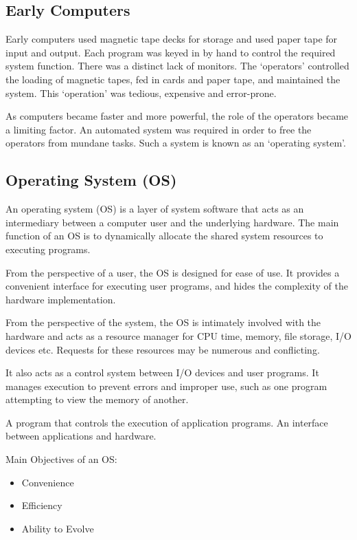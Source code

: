 \subsection{Early Computers}

Early computers used magnetic tape decks for storage and used paper tape for input and output.
Each program was keyed in by hand to control the required system function.
There was a distinct lack of monitors.
The `operators' controlled the loading of magnetic tapes, fed in cards and paper tape, and maintained the system.
This `operation' was tedious, expensive and error-prone.

As computers became faster and more powerful, the role of the operators became a limiting factor.
An automated system was required in order to free the operators from mundane tasks.
Such a system is known as an `operating system'.

\subsection{Operating System (OS)}

An operating system (OS) is a layer of system software that acts as an intermediary between a computer user and the underlying hardware.
The main function of an OS is to dynamically allocate the shared system resources to executing programs.

From the perspective of a user, the OS is designed for ease of use.
It provides a convenient interface for executing user programs, and hides the complexity of the hardware implementation.

From the perspective of the system, the OS is intimately involved with the hardware and acts as a resource manager for CPU time, memory, file storage, I/O devices etc.
Requests for these resources may be numerous and conflicting.

It also acts as a control system between I/O devices and user programs.
It manages execution to prevent errors and improper use, such as one program attempting to view the memory of another.

A program that controls the execution of application programs.
An interface between applications and hardware.

Main Objectives of an OS:
\begin{itemize}
 \item Convenience
 \item Efficiency
 \item Ability to Evolve
\end{itemize}


